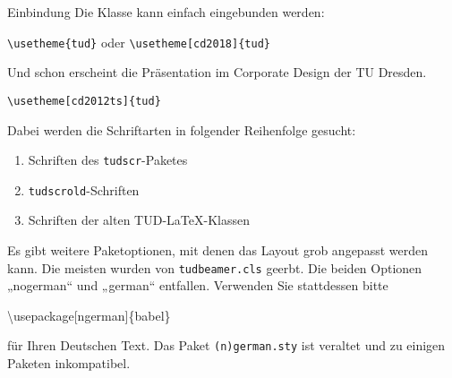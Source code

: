 \begin{frame}[allowframebreaks]{Einbindung}
  Die Klasse kann einfach eingebunden werden:
  \begin{block}{}
    \texttt{\textbackslash usetheme\{tud\}} oder
    \texttt{\textbackslash usetheme[cd2018]\{tud\}}
  \end{block}
  Und schon erscheint die Präsentation im Corporate Design der TU Dresden.

  \begin{block}{}
    \texttt{\textbackslash usetheme[cd2012ts]\{tud\}}
  \end{block}
  Dabei werden die Schriftarten in folgender Reihenfolge gesucht:
  \begin{enumerate}
  \item Schriften des \texttt{tudscr}-Paketes
  \item<+-> \texttt{tudscrold}-Schriften
  \item<+-> Schriften der alten TUD-\LaTeX-Klassen
  \end{enumerate}
  \framebreak
  Es gibt weitere Paketoptionen, mit denen das Layout grob angepasst
  werden kann.  Die meisten wurden von \texttt{tudbeamer.cls}
  geerbt. Die beiden Optionen „nogerman“ und „german“
  entfallen. Verwenden Sie stattdessen bitte
  \begin{block}{}
    \textbackslash usepackage[ngerman]\{babel\}
  \end{block}
  für Ihren Deutschen Text. Das Paket \texttt{(n)german.sty} ist
  veraltet und zu einigen Paketen inkompatibel.
\end{frame}

